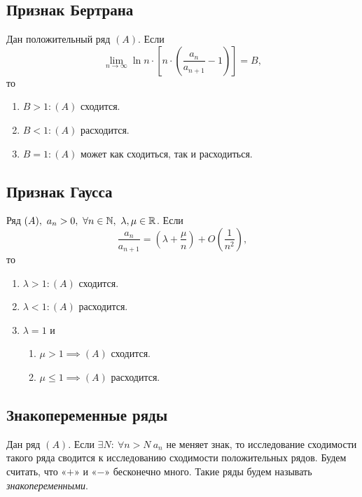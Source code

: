 \subsection{Признак Бертрана}

\begin{theorem}
    Дан положительный ряд $(A)$. Если
    \[
        \underset{n\rightarrow\infty}{\lim} \ln n \cdot \left[n \cdot \left(\frac{a_n}{a_{n+1}} - 1\right)\right] = B,
    \]
    то
    \begin{enumerate}
        \item $B > 1: (A)$ сходится.
        \item $B < 1: (A)$ расходится.
        \item $B = 1: (A)$ может как сходиться, так и расходиться.
    \end{enumerate}
\end{theorem}

\subsection{Признак Гаусса}

\begin{theorem}
    Ряд $(A), \ a_n > 0, \ \forall n \in \mathbb{N}, \ \lambda, \mu \in \mathbb{R}$. Если
    \[
        \frac{a_n}{a_{n+1}} = \left(\lambda + \frac{\mu}{n}\right) + O\left(\frac{1}{n^2}\right),
    \]
    то
    \begin{enumerate}
        \item $\lambda > 1: (A)$ сходится.
        \item $\lambda < 1: (A)$ расходится.
        \item $\lambda = 1$ и \begin{enumerate}
                  \item $\mu > 1 \implies (A)$ сходится.
                  \item $\mu \leqslant 1 \implies (A)$ расходится.
              \end{enumerate}
    \end{enumerate}
\end{theorem}

\newpage

\subsection{Знакопеременные ряды}

\begin{note}
    Дан ряд $(A)$. Если $\exists N: \ \forall n > N \ a_n$ не меняет знак, то исследование сходимости такого ряда сводится к исследованию сходимости положительных рядов. Будем считать, что «$+$» и «$-$» бесконечно много. Такие ряды будем называть \emph{знакопеременными}.
\end{note}

